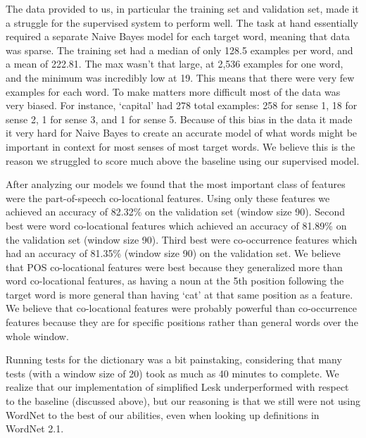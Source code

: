 \documentclass{article}
\begin{document}
The data provided to us, in particular the training set and validation set, made it a struggle for the supervised system to perform well. The task at hand essentially required a separate Naive Bayes model for each target word, meaning that data was sparse. The training set had a median of only 128.5 examples per word, and a mean of 222.81. The max wasn't that large, at 2,536 examples for one word, and the minimum was incredibly low at 19. This means that there were very few examples for each word. To make matters more difficult most of the data was very biased. For instance, `capital' had 278 total examples: 258 for sense 1, 18 for sense 2, 1 for sense 3, and 1 for sense 5. Because of this bias in the data it made it very hard for Naive Bayes to create an accurate model of what words might be important in context for most senses of most target words. We believe this is the reason we struggled to score much above the baseline using our supervised model. 

After analyzing our models we found that the most important class of features were the part-of-speech co-locational features. Using only these features we achieved an accuracy of 82.32\% on the validation set (window size 90). Second best were word co-locational features which achieved an accuracy of 81.89\% on the validation set (window size 90). Third best were co-occurrence features which had an accuracy of 81.35\% (window size 90) on the validation set. We believe that POS co-locational features were best because they generalized more than word co-locational features, as having a noun at the 5th position following the target word is more general than having `cat' at that same position as a feature. We believe that co-locational features were probably powerful than co-occurrence features because they are for specific positions rather than general words over the whole window.

Running tests for the dictionary was a bit painstaking, considering that many tests (with a window size of 20) took as much as 40 minutes to complete. We realize that our implementation of simplified Lesk underperformed with respect to the baseline (discussed above), but our reasoning is that we still were not using WordNet to the best of our abilities, even when looking up definitions in WordNet 2.1.
\end{document}
